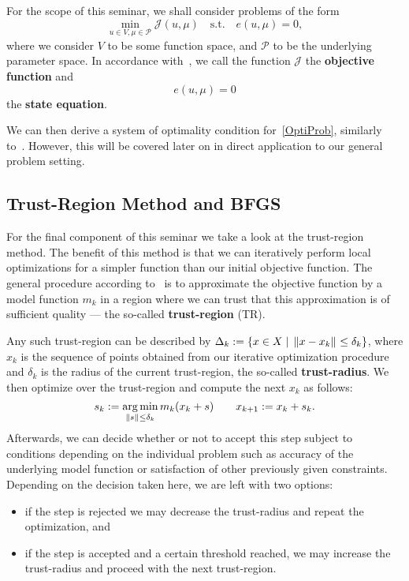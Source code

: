 For the scope of this seminar, we shall consider problems of the form
\begin{equation}\label{OptiProb}
    \min\limits_{u \in V, \mu \in \mathcal{P}} \mathcal{J}(u, \mu) \quad \text{s.t.} \quad e(u, \mu) = 0,
\end{equation}
where we consider $V$ to be some function space, and $\mathcal{P}$ to be the underlying parameter space.
In accordance with~\cite[Subsection 1.1.1 and Equation 1.4; Section 1.6 and Equation 1.81]{Hinze2009}, we call the function $\mathcal{J}$ the \textbf{objective function} and
\begin{equation}\label{StateEq}
    e(u, \mu) = 0
\end{equation}
the \textbf{state equation}.

We can then derive a system of optimality condition for~\eqref{OptiProb}, similarly to~\cite[Section 1.7]{Hinze2009}.
However, this will be covered later on in direct application to our general problem setting.

\subsection{Trust-Region Method and BFGS}\label{subsec:TRRB}

For the final component of this seminar we take a look at the trust-region method.
The benefit of this method is that we can iteratively perform local optimizations for a simpler function than our initial objective function.
The general procedure according to~\cite[Section 3.3]{Kelley1999} is to approximate the objective function by a model function $m_k$ in a region where we can trust that this approximation is of sufficient quality --- the so-called \textbf{trust-region} (TR).

Any such trust-region can be described by $\Delta_k := \{ x \in X \; | \; \left\lVert x - x_k\right\rVert_{} \leq \delta_k \}$, where $x_k$ is the sequence of points obtained from our iterative optimization procedure and $\delta_k$ is the radius of the current trust-region, the so-called \textbf{trust-radius}.
We then optimize over the trust-region and compute the next $x_k$ as follows:
\begin{equation}\label{TROpti}
    s_k := \operatorname*{arg\,min}\limits_{\left\lVert s\right\rVert_{} \leq \delta_k} m_k(x_k + s) \qquad x_{k + 1} := x_k + s_k.
\end{equation}
Afterwards, we can decide whether or not to accept this step subject to conditions depending on the individual problem such as accuracy of the underlying model function or satisfaction of other previously given constraints.
Depending on the decision taken here, we are left with two options:
\begin{itemize}
    \item if the step is rejected we may decrease the trust-radius and repeat the optimization, and
    \item if the step is accepted and a certain threshold reached, we may increase the trust-radius and proceed with the next trust-region.
\end{itemize}

